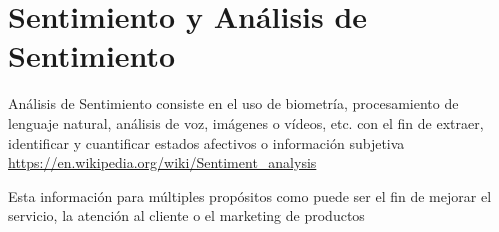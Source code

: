 \section{Sentimiento y Análisis de Sentimiento}

Análisis de Sentimiento consiste en el uso de biometría, procesamiento de lenguaje natural, análisis de voz, imágenes o vídeos, etc. con el fin de extraer, identificar y cuantificar estados afectivos o información subjetiva 
\url{https://en.wikipedia.org/wiki/Sentiment_analysis}

Esta información para múltiples propósitos como puede ser el fin de mejorar el servicio, la atención al cliente o el marketing de productos
